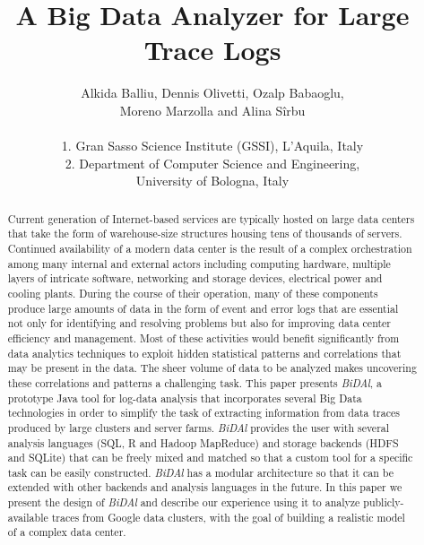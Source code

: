 \documentclass{article}
\begin{document}
\title{A Big Data Analyzer for Large Trace Logs}




\author{Alkida Balliu, Dennis Olivetti, Ozalp Babaoglu,\\
        Moreno Marzolla and Alina S\^irbu\\
        \\
        1. Gran Sasso Science Institute (GSSI), L'Aquila, Italy\\
	2. Department of Computer Science and Engineering, \\University of Bologna, Italy
}



      
         
\date{}


\maketitle

\begin{abstract}
Current generation of Internet-based services are typically hosted on large data centers that take the form of warehouse-size structures housing tens of thousands of servers. Continued availability of a modern data center is the result of a complex orchestration among many internal and external actors including computing hardware, multiple layers of intricate software, networking and storage devices, electrical power and cooling plants.  During the course of their operation, many of these components produce large amounts of data in the form of event and error logs that are essential not only for identifying and resolving problems but also for improving data center efficiency and management. Most of these activities would benefit significantly from data analytics techniques to exploit hidden statistical patterns and correlations that may be present in the data. The sheer volume of data to be analyzed makes uncovering these correlations and patterns a challenging task. This paper presents \emph{BiDAl}, a prototype Java tool for log-data analysis that incorporates several Big Data technologies in order to simplify the task of extracting information from data traces produced by large clusters and server farms. \emph{BiDAl} provides the user with several analysis languages (SQL, R and Hadoop MapReduce) and storage backends (HDFS and SQLite) that can be freely mixed and matched so that a custom tool for a specific task can be easily constructed. \emph{BiDAl} has a modular architecture so that it can be extended with other backends and analysis languages in the future. In this paper we present the design of \emph{BiDAl} and describe our experience using it to analyze publicly-available traces from Google data clusters, with the goal of building a realistic model of a complex data center.
\end{abstract}
\end{document}
